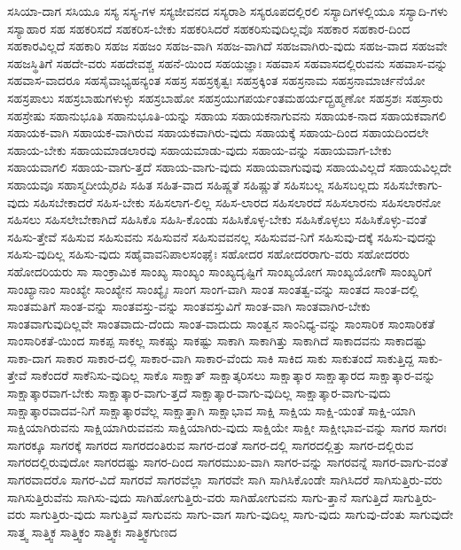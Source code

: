{ಸಸಿಯಾ-ದಾಗ
ಸಸಿಯೂ
ಸಸ್ಯ
ಸಸ್ಯ-ಗಳ
ಸಸ್ಯಜೀವನದ
ಸಸ್ಯರಾಶಿ
ಸಸ್ಯರೂಪದಲ್ಲಿರಲಿ
ಸಸ್ಯಾದಿಗಳಲ್ಲಿಯೂ
ಸಸ್ಯಾದಿ-ಗಳು
ಸಸ್ಯಾಹಾರ
ಸಹ
ಸಹಕರಿಸದೆ
ಸಹಕರಿಸ-ಬೇಕು
ಸಹಕರಿಸಿದರೆ
ಸಹಕರಿಸುವುದಿಲ್ಲವೊ
ಸಹಕಾರ
ಸಹಕಾರ-ದಿಂದ
ಸಹಕಾರವಿಲ್ಲದೆ
ಸಹಕಾರಿ
ಸಹಜ
ಸಹಜಂ
ಸಹಜ-ವಾಗಿ
ಸಹಜ-ವಾಗಿದೆ
ಸಹಜವಾಗಿರು-ವುದು
ಸಹಜ-ವಾದ
ಸಹಜವೇ
ಸಹಜಸ್ಥಿತಿಗೆ
ಸಹದೇ-ವರು
ಸಹದೇವಶ್ಚ
ಸಹನೆ-ಯಿಂದ
ಸಹಯಜ್ಞಾಃ
ಸಹವಾಸ
ಸಹವಾಸದಲ್ಲಿರುವನು
ಸಹವಾಸ-ವನ್ನು
ಸಹವಾಸ-ವಾದರೂ
ಸಹಸೈವಾಭ್ಯಹನ್ಯಂತ
ಸಹಸ್ರ
ಸಹಸ್ರಕೃತ್ವಃ
ಸಹಸ್ರಕ್ಕಿಂತ
ಸಹಸ್ರನಾಮ
ಸಹಸ್ರನಾಮಾರ್ಚನೆಯೋ
ಸಹಸ್ರಪಾಲು
ಸಹಸ್ರಬಾಹುಗಳುಳ್ಳು
ಸಹಸ್ರಬಾಹೋ
ಸಹಸ್ರಯುಗಪರ್ಯಂತಮಹರ್ಯದ್ಬ್ರಹ್ಮಣೋ
ಸಹಸ್ರಶಃ
ಸಹಸ್ರಾರು
ಸಹಸ್ರೇಷು
ಸಹಾನುಭೂತಿ
ಸಹಾನುಭೂತಿ-ಯನ್ನು
ಸಹಾಯ
ಸಹಾಯಕನಾಗುವನು
ಸಹಾಯಕ-ನಾದ
ಸಹಾಯಕವಾಗಲಿ
ಸಹಾಯಕ-ವಾಗಿ
ಸಹಾಯಕ-ವಾಗಿರುವ
ಸಹಾಯಕವಾಗಿರು-ವುದು
ಸಹಾಯಕ್ಕೆ
ಸಹಾಯ-ದಿಂದ
ಸಹಾಯದಿಂದಲೇ
ಸಹಾಯ-ಬೇಕು
ಸಹಾಯಮಾಡಲಾರವು
ಸಹಾಯಮಾಡು-ವುದು
ಸಹಾಯ-ವನ್ನು
ಸಹಾಯವಾಗ-ಬೇಕು
ಸಹಾಯವಾಗಲಿ
ಸಹಾಯ-ವಾಗು-ತ್ತದೆ
ಸಹಾಯ-ವಾಗು-ವುದು
ಸಹಾಯವಾಗುವುವು
ಸಹಾಯವಿಲ್ಲದೆ
ಸಹಾಯವಿಲ್ಲದೇ
ಸಹಾಯವೂ
ಸಹಾಸ್ಮದೀಯೈರಪಿ
ಸಹಿತ
ಸಹಿತ-ವಾದ
ಸಹಿಷ್ಣತೆ
ಸಹಿಷ್ಣುತೆ
ಸಹಿಸಬಲ್ಲ
ಸಹಿಸಬಲ್ಲದು
ಸಹಿಸಬೇಕಾಗು-ವುದು
ಸಹಿಸಬೇಕಾದರೆ
ಸಹಿಸ-ಬೇಕು
ಸಹಿಸಲಾಗ-ಲಿಲ್ಲ
ಸಹಿಸ-ಲಾರದ
ಸಹಿಸಲಾರದೆ
ಸಹಿಸಲಾರನು
ಸಹಿಸಲಾರನೋ
ಸಹಿಸಲು
ಸಹಿಸಲೇಬೇಕಾಗಿದೆ
ಸಹಿಸಿಕೊ
ಸಹಿಸಿ-ಕೊಂಡು
ಸಹಿಸಿಕೊಳ್ಳ-ಬೇಕು
ಸಹಿಸಿಕೊಳ್ಳಲು
ಸಹಿಸಿಕೊಳ್ಳು-ವಂತೆ
ಸಹಿಸು-ತ್ತೇವೆ
ಸಹಿಸುವ
ಸಹಿಸುವನು
ಸಹಿಸುವನೆ
ಸಹಿಸುವವನಲ್ಲ
ಸಹಿಸುವವ-ನಿಗೆ
ಸಹಿಸುವು-ದಕ್ಕೆ
ಸಹಿಸು-ವುದನ್ನು
ಸಹಿಸು-ವುದಿಲ್ಲ
ಸಹಿಸು-ವುದು
ಸಹೈವಾವನಿಪಾಲಸಂಘೈಃ
ಸಹೋದರ
ಸಹೋದರರಾಗು-ವರು
ಸಹೋದರರು
ಸಹೋದರಿಯರು
ಸಾ
ಸಾಂಕ್ರಾಮಿಕ
ಸಾಂಖ್ಯ
ಸಾಂಖ್ಯಂ
ಸಾಂಖ್ಯದೃಷ್ಟಿಗೆ
ಸಾಂಖ್ಯಯೋಗ
ಸಾಂಖ್ಯಯೋಗೌ
ಸಾಂಖ್ಯರಿಗೆ
ಸಾಂಖ್ಯಾನಾಂ
ಸಾಂಖ್ಯೇ
ಸಾಂಖ್ಯೇನ
ಸಾಂಖ್ಯೈಃ
ಸಾಂಗ
ಸಾಂಗ-ವಾಗಿ
ಸಾಂತ
ಸಾಂತತ್ವ-ವನ್ನು
ಸಾಂತದ
ಸಾಂತ-ದಲ್ಲಿ
ಸಾಂತಮತಿಗೆ
ಸಾಂತ-ವನ್ನು
ಸಾಂತವಸ್ತು-ವನ್ನು
ಸಾಂತವಸ್ತುವಿಗೆ
ಸಾಂತ-ವಾಗಿ
ಸಾಂತವಾಗಿರ-ಬೇಕು
ಸಾಂತವಾಗುವುದಿಲ್ಲವೇ
ಸಾಂತವಾದು-ದೆಂದು
ಸಾಂತ-ವಾದುದು
ಸಾಂತ್ವನ
ಸಾಂನಿಧ್ಯ-ವನ್ನು
ಸಾಂಸಾರಿಕ
ಸಾಂಸಾರಿಕತೆ
ಸಾಂಸಾರಿಕತೆ-ಯಿಂದ
ಸಾಕಪ್ಪ
ಸಾಕಲ್ಲ
ಸಾಕಷ್ಚು
ಸಾಕಷ್ಟು
ಸಾಕಾಗಿ
ಸಾಕಾಗಿತ್ತು
ಸಾಕಾಗಿದೆ
ಸಾಕಾದವನು
ಸಾಕಾದಷ್ಟು
ಸಾಕಾ-ದಾಗ
ಸಾಕಾರ
ಸಾಕಾರ-ದಲ್ಲಿ
ಸಾಕಾರ-ವಾಗಿ
ಸಾಕಾರ-ವೆಂದು
ಸಾಕಿ
ಸಾಕಿದ
ಸಾಕು
ಸಾಕುತಂದೆ
ಸಾಕುತ್ತಿದ್ದ
ಸಾಕು-ತ್ತೇವೆ
ಸಾಕೆಂದರೆ
ಸಾಕೆನಿಸು-ವುದಿಲ್ಲ
ಸಾಕೊ
ಸಾಕ್ಷಾತ್
ಸಾಕ್ಷಾತ್ಕರಿಸಲು
ಸಾಕ್ಷಾತ್ಕಾರ
ಸಾಕ್ಷಾತ್ಕಾರದ
ಸಾಕ್ಷಾತ್ಕಾರ-ವನ್ನು
ಸಾಕ್ಷಾತ್ಕಾರವಾಗ-ಬೇಕು
ಸಾಕ್ಷಾತ್ಕಾರ-ವಾಗು-ತ್ತದೆ
ಸಾಕ್ಷಾತ್ಕಾರ-ವಾಗು-ವುದಿಲ್ಲ
ಸಾಕ್ಷಾತ್ಕಾರ-ವಾಗು-ವುದು
ಸಾಕ್ಷಾತ್ಕಾರವಾದವ-ನಿಗೆ
ಸಾಕ್ಷಾತ್ಕಾರವೆಲ್ಲ
ಸಾಕ್ಷಾತ್ತಾಗಿ
ಸಾಕ್ಷಾಭಾವ
ಸಾಕ್ಷಿ
ಸಾಕ್ಷಿಯ
ಸಾಕ್ಷಿ-ಯಂತೆ
ಸಾಕ್ಷಿ-ಯಾಗಿ
ಸಾಕ್ಷಿಯಾಗಿರುವನು
ಸಾಕ್ಷಿಯಾಗಿರುವವನು
ಸಾಕ್ಷಿಯಾಗಿರು-ವುದು
ಸಾಕ್ಷಿಯೇ
ಸಾಕ್ಷೀ
ಸಾಕ್ಷೀಭಾವ-ವನ್ನು
ಸಾಗರ
ಸಾಗರಃ
ಸಾಗರಕ್ಕೂ
ಸಾಗರಕ್ಕೆ
ಸಾಗರದ
ಸಾಗರದಂತಿರುವ
ಸಾಗರ-ದಂತೆ
ಸಾಗರ-ದಲ್ಲಿ
ಸಾಗರದಲ್ಲಿತ್ತು
ಸಾಗರ-ದಲ್ಲಿರುವ
ಸಾಗರದಲ್ಲಿರುವುದೋ
ಸಾಗರದಷ್ಟು
ಸಾಗರ-ದಿಂದ
ಸಾಗರಮುಖ-ವಾಗಿ
ಸಾಗರ-ವನ್ನು
ಸಾಗರವನ್ನೆ
ಸಾಗರ-ವಾಗು-ವಂತೆ
ಸಾಗರವಾದರೊ
ಸಾಗರ-ವಿದೆ
ಸಾಗರವೆ
ಸಾಗರವೆಲ್ಲಾ
ಸಾಗರವೇ
ಸಾಗಿ
ಸಾಗಿಸಿಕೊಂಡೇ
ಸಾಗಿಸಿದರೆ
ಸಾಗಿಸುತ್ತಿರು-ವರು
ಸಾಗಿಸುತ್ತಿರುವೆನು
ಸಾಗಿಸು-ವುದು
ಸಾಗಿಹೋಗುತ್ತಿರು-ವರು
ಸಾಗಿಹೋಗುವನು
ಸಾಗು-ತ್ತಾನೆ
ಸಾಗುತ್ತಿದೆ
ಸಾಗುತ್ತಿರು-ವರು
ಸಾಗುತ್ತಿರು-ವುದು
ಸಾಗುತ್ತಿವೆ
ಸಾಗುವನು
ಸಾಗು-ವಾಗ
ಸಾಗು-ವುದಿಲ್ಲ
ಸಾಗು-ವುದು
ಸಾಗುವು-ದೆಂತು
ಸಾಗುವುದೇ
ಸಾತ್ತ್ವ
ಸಾತ್ತ್ವಿಕ
ಸಾತ್ತ್ವಿಕಂ
ಸಾತ್ತ್ವಿಕಃ
ಸಾತ್ತ್ವಿಕಗುಣದ
}
